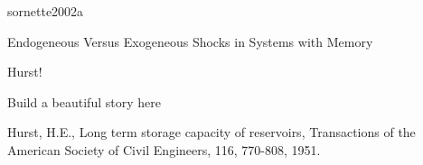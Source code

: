 sornette2002a

Endogeneous Versus Exogeneous Shocks in Systems with Memory

Hurst!
\cite{hurst1951a}

Build a beautiful story here

  

  

Hurst, H.E., Long term storage capacity of reservoirs, Transactions of the American Society of Civil Engineers, 116, 770-808, 1951.

